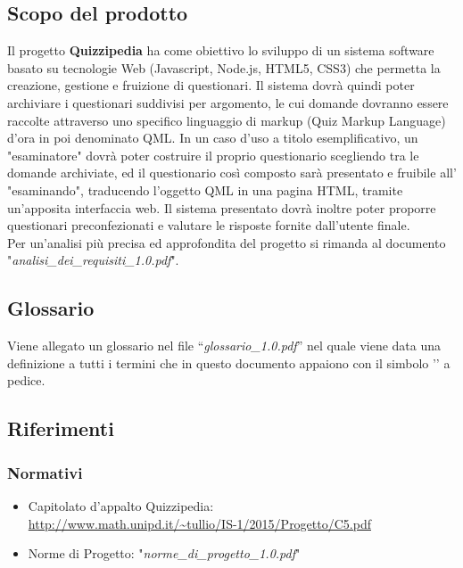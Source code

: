 \documentclass[a4paper,11pt]{article}
\begin{document}
	
	\subsection{Scopo del prodotto}
	Il progetto \textbf{Quizzipedia} ha come obiettivo lo sviluppo di un sistema software basato su tecnologie Web (Javascript\addglos, Node.js\addglos, HTML5\addglos, CSS3\addglos) che permetta la creazione, gestione e fruizione di questionari. Il sistema dovrà quindi poter archiviare i questionari suddivisi per argomento, le cui domande dovranno essere raccolte attraverso uno specifico linguaggio di markup (Quiz Markup Language) d'ora in poi denominato QML\addglos. In un caso d'uso a titolo esemplificativo, un "esaminatore" dovrà poter costruire il proprio questionario scegliendo tra le domande archiviate, ed il questionario così composto sarà presentato e fruibile all' "esaminando", traducendo l'oggetto QML in una pagina HTML\addglos, tramite un'apposita interfaccia web. Il sistema presentato dovrà inoltre poter proporre questionari preconfezionati e valutare le risposte fornite dall'utente finale.
	\\
	Per un'analisi più precisa ed approfondita del progetto si rimanda al documento\\ "\textit{analisi\_dei\_requisiti\_1.0.pdf}".
	\subsection{Glossario}
	Viene allegato un glossario nel file ``\textit{glossario\_1.0.pdf}'' nel quale viene data una definizione a tutti i termini che in questo documento appaiono con il simbolo '\addglos' a pedice.
	\newpage
	\subsection{Riferimenti}
		\subsubsection{Normativi}
		\begin{itemize}
			\item Capitolato d'appalto Quizzipedia:\\
			\url{http://www.math.unipd.it/~tullio/IS-1/2015/Progetto/C5.pdf}
			\item Norme di Progetto: "\textit{norme\_di\_progetto\_1.0.pdf}"
		\end{itemize}
\end{document}
